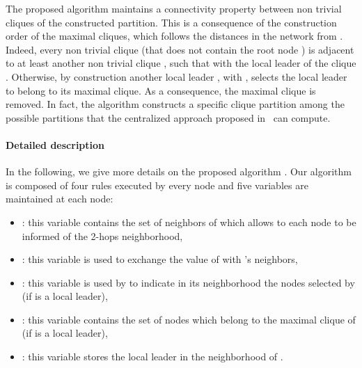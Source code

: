 \documentclass[11pt,letterpaper,onecolumn]{article}
\begin{document}
The proposed algorithm maintains a connectivity property between non trivial cliques of the constructed partition. This is a consequence of the construction order of the maximal cliques, which follows the distances in the network from . Indeed, every non trivial clique  (that does not contain the root node ) is adjacent to at least another non trivial clique , such that  with  the local leader of the clique . Otherwise, by construction another local leader , with , selects the local leader  to belong to its maximal clique. As a consequence, the maximal clique  is removed. In fact, the algorithm constructs a specific clique partition among the possible partitions that the centralized approach proposed in~\cite{DelbotLP13} can compute.


\paragraph{Detailed description}

In the following, we give more details on the proposed algorithm . Our algorithm is composed of four rules executed by every node and five variables are maintained at each node:

\begin{itemize}
\item : this variable contains the set of neighbors of  which allows to each node to be informed of the 2-hops neighborhood,
\item : this variable is used to exchange the value of  with 's neighbors,
\item : this variable is used by  to indicate in its neighborhood the nodes selected by  (if  is a local leader),
\item : this variable contains the set of nodes which belong to the maximal clique of  (if  is a local leader),
\item : this variable stores the local leader in the neighborhood of .
\end{itemize}
\end{document}
